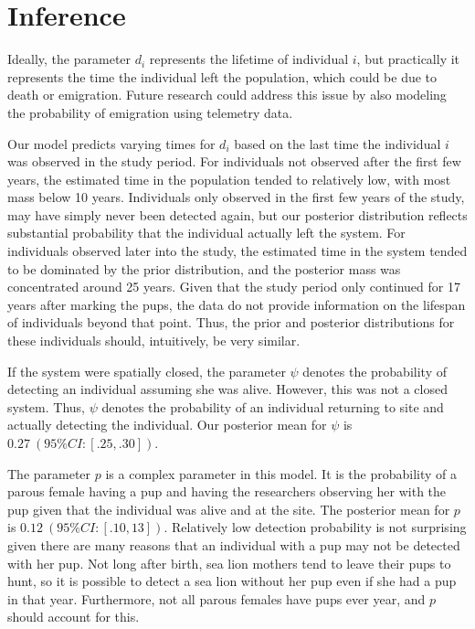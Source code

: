\documentclass[12pt, a4paper]{article}
\begin{document}
\section{Inference}

Ideally, the parameter $d_i$ represents the lifetime of individual $i$, but practically it represents the time the individual left the population, which could be due to death or emigration. Future research could address this issue by also modeling the probability of emigration using telemetry data. 

Our model predicts varying times for $d_i$ based on the last time the individual $i$ was observed in the study period. For individuals not observed after the first few years, the estimated time in the population tended to relatively low, with most mass below 10 years. Individuals only observed in the first few years of the study, may have simply never been detected again, but our posterior distribution reflects substantial probability that the individual actually left the system. For individuals observed later into the study, the estimated time in the system tended to be dominated by the prior distribution, and the posterior mass was concentrated around 25 years. Given that the study period only continued for 17 years after marking the pups, the data do not provide information on the lifespan of individuals beyond that point. Thus, the prior and posterior distributions for these individuals should, intuitively, be very similar.

If the system were spatially closed, the parameter $\psi$ denotes the probability of detecting an individual assuming she was alive. However, this was not a closed system. Thus, $\psi$ denotes the probability of an individual returning to site and actually detecting the individual. Our posterior mean for $\psi$ is $0.27~(95\% CI: [.25, .30])$. 

The parameter $p$ is a complex parameter in this model. It is the probability of a parous female having a pup and having the researchers observing her with the pup given that the individual was alive and at the site. The posterior mean for $p$ is $0.12~(95\% CI: [.10, 13])$. Relatively low detection probability is not surprising given there are many reasons that an individual with a pup may not be detected with her pup. Not long after birth, sea lion mothers tend to leave their pups to hunt, so it is possible to detect a sea lion without her pup even if she had a pup in that year. Furthermore, not all parous females have pups ever year, and $p$ should account for this. 
\end{document}
